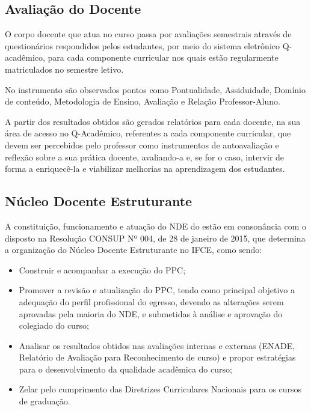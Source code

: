\documentclass{paper}
\begin{document}
\subsection{Avaliação do Docente}

O corpo docente que atua no curso passa por avaliações semestrais através de questionários respondidos pelos estudantes, por meio do sistema eletrônico Q-acadêmico, para cada componente curricular nos quais estão regularmente matriculados no semestre letivo. 

No instrumento são observados pontos como Pontualidade, Assiduidade, Domínio de conteúdo, Metodologia de Ensino, Avaliação e Relação Professor-Aluno.

A partir dos resultados obtidos são gerados relatórios para cada docente, na sua área de acesso no Q-Acadêmico, referentes a cada componente curricular, que devem ser percebidos pelo professor como instrumentos de autoavaliação e reflexão sobre a sua prática docente, avaliando-a e, se for o caso, intervir de forma a enriquecê-la e viabilizar melhorias na aprendizagem dos estudantes.


\subsection{Núcleo Docente Estruturante}


A constituição, funcionamento e atuação do NDE do \NOMECURSO estão em consonância com o disposto na Resolução CONSUP Nº 004, de 28 de janeiro de 2015, que determina a organização do Núcleo Docente Estruturante no IFCE, como sendo:
\begin{itemize}
\item Construir e acompanhar a execução do PPC;
\item Promover a revisão e atualização do PPC, tendo como principal objetivo a adequação do perfil profissional do egresso, devendo as alterações serem aprovadas pela maioria do NDE, e submetidas à análise e aprovação do colegiado do curso;
\item Analisar os resultados obtidos nas avaliações internas e externas (ENADE, Relatório de Avaliação para Reconhecimento de curso) e propor estratégias para o desenvolvimento da qualidade acadêmica do curso;
\item Zelar pelo cumprimento das Diretrizes Curriculares Nacionais para os cursos de graduação.
\end{itemize}
\end{document}
